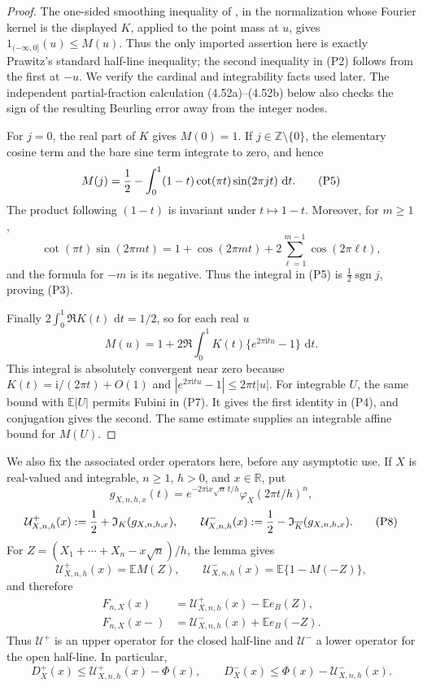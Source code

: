 \documentclass[11pt,a4paper]{article}
\numberwithin{equation}{section}
\theoremstyle{definition}
\theoremstyle{remark}
\newcommand{\E}{\mathbb E}
\newcommand{\ii}{\mathrm i}
\newcommand{\dd}{\,\mathrm d}
\begin{document}
\begin{proof}
The one-sided smoothing inequality of \cite{Prawitz1972}, in the normalization
whose Fourier kernel is the displayed $K$, applied to the point mass at
$u$, gives $1_{(-\infty,0]}(u)\le M(u)$.  Thus the only imported assertion
here is exactly Prawitz's standard half-line inequality; the second
inequality in (P2) follows from the first at $-u$.  We verify the cardinal
and integrability facts used later.  The independent partial-fraction
calculation (4.52a)--(4.52b) below also checks the sign of the resulting
Beurling error away from the integer nodes.

For $j=0$, the real part of $K$ gives $M(0)=1$.  If
$j\in\mathbb Z\setminus\{0\}$, the elementary cosine term and the bare sine
term integrate to zero, and hence
\[
 M(j)={1\over2}-\int_0^1(1-t)\cot(\pi t)\sin(2\pi jt)\,\dd t.       \tag{P5}
\]
The product following $(1-t)$ is invariant under $t\mapsto1-t$.
Moreover, for $m\ge1$,
\[
 \cot(\pi t)\sin(2\pi mt)
 =1+\cos(2\pi mt)+2\sum_{\ell=1}^{m-1}\cos(2\pi\ell t),          \tag{P6}
\]
and the formula for $-m$ is its negative.  Thus the integral in (P5) is
$\tfrac12\operatorname {sgn}j$, proving (P3).

Finally $2\int_0^1\Re K(t)\,\dd t=1/2$, so for each real $u$
\[
 M(u)=1+2\Re\int_0^1K(t)\{e^{2\pi\ii tu}-1\}\,\dd t.             \tag{P7}
\]
This integral is absolutely convergent near zero because
$K(t)=\ii/(2\pi t)+O(1)$ and
$|e^{2\pi\ii tu}-1|\le2\pi t|u|$.  For integrable $U$, the same bound with
$\E|U|$ permits Fubini in (P7).  It gives the first identity in (P4), and
conjugation gives the second.  The same estimate supplies an integrable
affine bound for $M(U)$.
\end{proof}

We also fix the associated order operators here, before any asymptotic use.
If $X$ is real-valued and integrable, $n\ge1$, $h>0$, and $x\in\mathbb R$,
put
\[
 g_{X,n,h,x}(t)=e^{-2\pi\ii x\sqrt n\,t/h}
                 \varphi_X(2\pi t/h)^n,
\]
\[
 \mathcal U^+_{X,n,h}(x):={1\over2}+\mathfrak I_K(g_{X,n,h,x}),
 \qquad
 \mathcal U^-_{X,n,h}(x):={1\over2}-
                 \mathfrak I_{\overline K}(g_{X,n,h,x}).          \tag{P8}
\]
For $Z=(X_1+\cdots+X_n-x\sqrt n)/h$, the lemma gives
\[
 \mathcal U^+_{X,n,h}(x)=\E M(Z),\qquad
 \mathcal U^-_{X,n,h}(x)=\E\{1-M(-Z)\},                         \tag{P9}
\]
and therefore
\[
 \begin{aligned}
 F_{n,X}(x)&=\mathcal U^+_{X,n,h}(x)-\E e_B(Z),\\
 F_{n,X}(x-)&=\mathcal U^-_{X,n,h}(x)+\E e_B(-Z).
 \end{aligned}                                                    \tag{P10}
\]
Thus $\mathcal U^+$ is an upper operator for the closed half-line and
$\mathcal U^-$ a lower operator for the open half-line.  In particular,
\[
 D_X^+(x)\le\mathcal U^+_{X,n,h}(x)-\Phi(x),\qquad
 D_X^-(x)\le\Phi(x)-\mathcal U^-_{X,n,h}(x).                     \tag{P11}
\]
\end{document}
